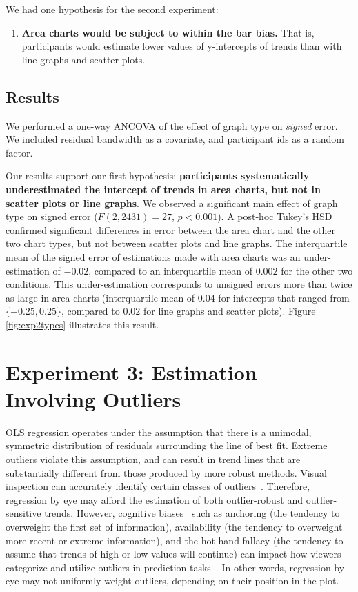 \documentclass{sigchi}
\begin{document}
We had one hypothesis for the second experiment:
\begin{enumerate}
	\item \textbf{Area charts would be subject to within the bar bias.} That is, participants would estimate lower values of y-intercepts of trends than with line graphs and scatter plots.
\end{enumerate}

\subsection{Results}
We performed a one-way ANCOVA of the effect of graph type on \emph{signed} error. We included residual bandwidth as a covariate, and participant ids as a random factor.

Our results support our first hypothesis: \textbf{participants systematically underestimated the intercept of trends in area charts, but not in scatter plots or line graphs}. We observed a significant main effect of graph type on signed error ($F(2,2431)=27$, $p<0.001$). A post-hoc Tukey's HSD confirmed significant differences in error between the area chart and the other two chart types, but not between scatter plots and line graphs. The interquartile mean of the signed error of estimations made with area charts was an under-estimation of $-0.02$, compared to an interquartile mean of $0.002$ for the other two conditions. This under-estimation corresponds to unsigned errors more than twice as large in area charts (interquartile mean of $0.04$ for intercepts that ranged from $\{-0.25,0.25\}$, compared to $0.02$ for line graphs and scatter plots). Figure \ref{fig:exp2types} illustrates this result.

\section{Experiment 3: Estimation Involving Outliers}

\outlierFig

\outliersFig


OLS regression operates under the assumption that there is a unimodal, symmetric distribution of residuals surrounding the line of best fit. Extreme outliers violate this assumption, and can result in trend lines that are substantially different from those produced by more robust methods. Visual inspection can accurately identify certain classes of outliers~\cite{albers2014task}. Therefore, regression by eye may afford the estimation of both outlier-robust and outlier-sensitive trends. However, cognitive biases~\cite{tversky1975judgment} such as anchoring (the tendency to overweight the first set of information), availability (the tendency to overweight more recent or extreme information), and the hot-hand fallacy (the tendency to assume that trends of high or low values will continue) can impact how viewers categorize and utilize outliers in prediction tasks~\cite{campbell2009anchoring, ji2001culture}. In other words, regression by eye may not uniformly weight outliers, depending on their position in the plot.
\end{document}

